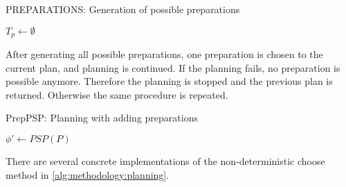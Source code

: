 \begin{algorithm}
    \caption{PREPARATIONS: Generation of possible preparations}
    \label{alg:methodology:preparations}
    $T_p \leftarrow \emptyset$\;
\end{algorithm}

After generating all possible preparations, one preparation is chosen to the current plan, and planning is continued.
If the planning fails, no preparation is possible anymore.
Therefore the planning is stopped and the previous plan is returned.
Otherwise the same procedure is repeated.

\begin{algorithm}
    \caption{PrepPSP: Planning with adding preparations}
    \label{alg:methodology:planning}
    $\phi' \leftarrow PSP(P)$\;
\end{algorithm}

There are several concrete implementations of the non-deterministic choose method in \ref{alg:methodology:planning}.

